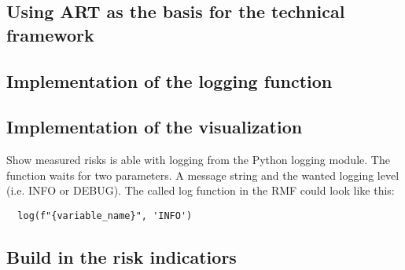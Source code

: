 \subsection{Using ART as the basis for the technical framework}

\subsection{Implementation of the logging function}

\subsection{Implementation of the visualization}

Show measured risks is able with logging from the Python logging module. The function waits for two parameters. A message string and the wanted logging level (i.e. INFO or DEBUG). The called log function in the RMF could look like this:
\begin{lstlisting}
  log(f"{variable_name}", 'INFO')
\end{lstlisting}

\subsection{Build in the risk indicatiors}
